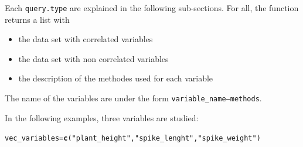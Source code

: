 \documentclass{article}\usepackage[]{graphicx}\usepackage[]{color}
\makeatletter
\newcommand{\hlstr}[1]{\textcolor[rgb]{0.192,0.494,0.8}{#1}}%
\newcommand{\hlstd}[1]{\textcolor[rgb]{0.345,0.345,0.345}{#1}}%
\newcommand{\hlkwb}[1]{\textcolor[rgb]{0.69,0.353,0.396}{#1}}%
\newcommand{\hlkwd}[1]{\textcolor[rgb]{0.737,0.353,0.396}{\textbf{#1}}}%
\newenvironment{kframe}{%
 \def\at@end@of@kframe{}%
 \ifinner\ifhmode%
  \def\at@end@of@kframe{\end{minipage}}%
  \begin{minipage}{\columnwidth}%
 \fi\fi%
 \def\FrameCommand##1{\hskip\@totalleftmargin \hskip-\fboxsep
 \colorbox{shadecolor}{##1}\hskip-\fboxsep
     \hskip-\linewidth \hskip-\@totalleftmargin \hskip\columnwidth}%
 \MakeFramed {\advance\hsize-\width
   \@totalleftmargin\z@ \linewidth\hsize
   \@setminipage}}%
 {\par\unskip\endMakeFramed%
 \at@end@of@kframe}
\newenvironment{knitrout}{}{} %
\makeatother
\begin{document}
Each \texttt{query.type} are explained in the following sub-sections.
For all, the function returns a list with
\begin{itemize}
\item the data set with correlated variables
\item the data set with non correlated variables
\item the description of the methodes used for each variable
\end{itemize}

The name of the variables are under the form \texttt{variable\_name---methods}.

\vspace{.5cm}

In the following examples, three variables are studied:

\begin{knitrout}
\color{fgcolor}\begin{kframe}
\begin{alltt}
\hlstd{vec_variables} \hlkwb{=} \hlkwd{c}\hlstd{(}\hlstr{"plant_height"}\hlstd{,} \hlstr{"spike_lenght"}\hlstd{,} \hlstr{"spike_weight"}\hlstd{)}
\end{alltt}
\end{kframe}
\end{knitrout}
\end{document}
